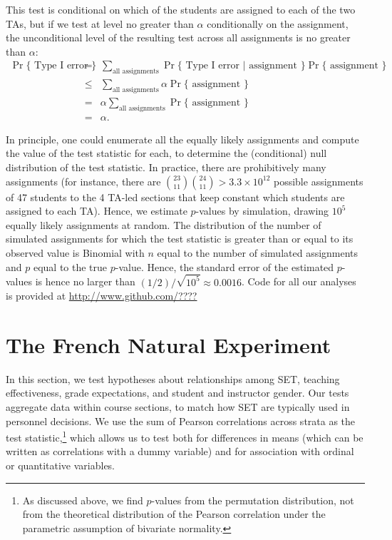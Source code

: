 \documentclass[12pt]{article}
\newcommand{\todo}[1]{{\color{red}{TO DO: \sc #1}}}
\begin{document}
This test is conditional on which of the students are assigned to each of the two 
TAs, but if we test at level no greater than $\alpha$ conditionally on the
assignment, the unconditional level of the resulting test across all assignments is no 
greater than $\alpha$:
\begin{eqnarray}
   \Pr \{ \mbox{ Type I error } \} &=& \sum_{\mbox{all assignments}} \Pr \{ \mbox{ Type I error } | 
   \mbox{ assignment } \} \Pr\{\mbox{ assignment } \} \nonumber \\
   &\le& 
    \sum_{\mbox{all assignments}} \alpha \Pr\{\mbox{ assignment } \} \nonumber \\
    &=& \alpha \sum_{\mbox{all assignments}} \Pr\{\mbox{ assignment } \} \nonumber \\
    &=& \alpha.
\end{eqnarray}

In principle, one could enumerate all the equally likely assignments and compute the value
of the test statistic for each, to determine the (conditional) null distribution of the test
statistic.
In practice, there are prohibitively many assignments
(for instance, there are ${{23}\choose{11}}{{24}\choose{11}} > 3.3\times 10^{12}$ 
possible assignments
of 47 students to the 4 TA-led sections that keep constant which
students are assigned to each TA).
Hence, we estimate $p$-values by simulation, drawing $10^5$ equally likely assignments
at random.
The distribution of the number of simulated assignments for which the test statistic
is greater than or equal to its observed value is Binomial with $n$ equal to the number of
simulated assignments and $p$ equal to the true $p$-value.
Hence, the standard error of the estimated $p$-values is hence no larger than 
$(1/2)/ \sqrt{10^5}
\approx 0.0016$.
Code for all our analyses is provided at \url{http://www.github.com/????} \todo{Fix!}

\section{The French Natural Experiment} \label{sec:Fr-results}
In this section, we test hypotheses about relationships among
SET, teaching effectiveness, grade expectations, and student and instructor gender.
Our tests aggregate data within course sections, to match how SET are typically
used in personnel decisions. 
We use the sum of Pearson correlations across strata as the test statistic,\footnote{%
As discussed above, we find $p$-values from the permutation distribution, not from
the theoretical distribution of the Pearson correlation 
under the parametric assumption of bivariate normality.
} 
which allows us to test both for 
differences in means (which can be written as correlations with a dummy variable) and for 
association with ordinal or quantitative variables.
\end{document}
